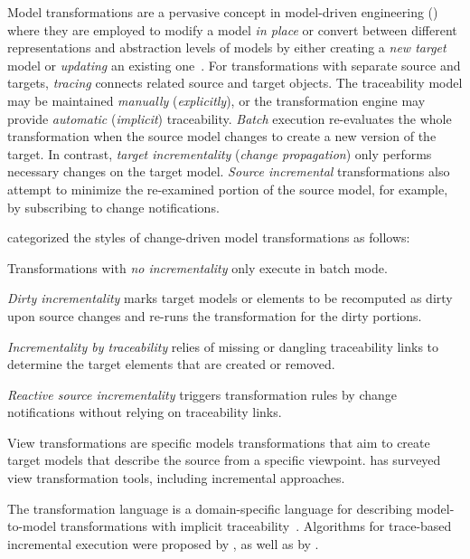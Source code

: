 Model transformations are a pervasive concept in model-driven engineering () where they are employed to modify a model \emph{in place} or convert between different representations and abstraction levels of models by either creating a \emph{new target} model or \emph{updating} an existing one~\citep{Czarnecki06survey}. For transformations with separate source and targets, \emph{tracing} connects related source and target objects. The traceability model may be maintained \emph{manually} (\emph{explicitly}), or the transformation engine may provide \emph{automatic} (\emph{implicit}) traceability. \emph{Batch} execution re-evaluates the whole transformation when the source model changes to create a new version of the target. In contrast, \emph{target incrementality} (\emph{change propagation}) only performs necessary changes on the target model. \emph{Source incremental} transformations also attempt to minimize the re-examined portion of the source model, for example, by subscribing to change notifications.

\citet{Varro15styles} categorized the styles of change-driven model transformations as follows:
\begin{inparaenum}
\item Transformations with \emph{no incrementality} only execute in batch mode.
\item \emph{Dirty incrementality} marks target models or elements to be recomputed as dirty upon source changes and re-runs the transformation for the dirty portions.
\item \emph{Incrementality by traceability} relies of missing or dangling traceability links to determine the target elements that are created or removed.
\item \emph{Reactive source incrementality} triggers transformation rules by change notifications without relying on traceability links.
\end{inparaenum}

View transformations are specific models transformations that aim to create target models that describe the source from a specific viewpoint. \citet{Bruneliere17survey} has surveyed view transformation tools, including incremental approaches.

The  transformation language is a domain-specific language for describing model-to-model transformations with implicit traceability~\citep{Jouault08atl}. Algorithms for trace-based incremental  execution were proposed by \citet{Xiong07incremental}, as well as by \citet{Jouault10incremental}.

